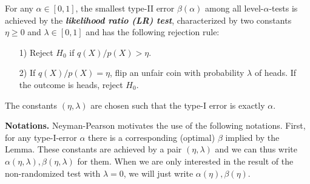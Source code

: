 \begin{theo}
\label{theo: NP lemma}
For any $\alpha \in [0,1]$, the smallest  type-II error $\beta(\alpha)$ among all level-$\alpha$-tests is achieved by the \textbf{{\em likelihood ratio (LR) test}}, characterized by two constants $\eta \ge 0$ and $\lambda\in [0,1]$ and has the following rejection rule:
\begin{itemize}
    \item[1)] Reject $H_0$ if $q(X)/p(X) >\eta$.
    \item[2)] If $q(X)/p(X)=\eta$, flip an unfair coin with probability $\lambda$ of heads. If the outcome is heads, reject $H_0$.
\end{itemize} 
The constants $(\eta, \lambda)$ are chosen such that the type-I error is exactly $\alpha$.
\end{theo}

\noindent \textbf{Notations.}  Neyman-Pearson  motivates the use of the following notations. First, for any type-I-error $\alpha$ there is a corresponding (optimal) $\beta$ implied by the Lemma. These constants are achieved by a pair $(\eta, \lambda)$ and we can thus write $\alpha(\eta, \lambda), \beta(\eta, \lambda)$ for them. When we are only interested in the result of the non-randomized test with $\lambda=0$, we will just write   $\alpha(\eta), \beta(\eta)$.




